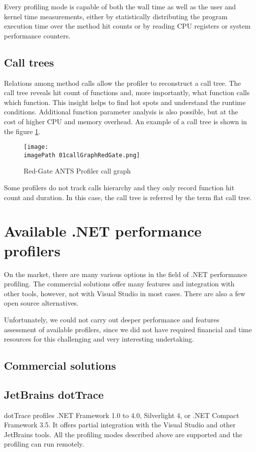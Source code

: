 Every profiling mode is capable of both the wall time as well as the user and kernel time measurements, either by statistically distributing the program execution time over the method hit counts or by reading CPU registers or system performance counters.

\subsection{Call trees}
Relations among method calls allow the profiler to reconstruct a call tree. The call tree reveals hit count of functions and, more importantly, what function calls which function. This insight helps to find hot spots and understand the runtime conditions.
Additional function parameter analysis is also possible, but at the cost of higher CPU and memory overhead. An example of a call tree is shown in the figure \ref{fig:01callGraphRedGate}.

\begin{figure}
	\centering
		\texttt{[image: \\imagePath 01callGraphRedGate.png]}
		\caption{Red-Gate ANTS Profiler call graph}
	\label{fig:01callGraphRedGate}
\end{figure}

Some profilers do not track calls hierarchy and they only record function hit count and duration. In this case, the call tree is referred by the term flat call tree.

\section{Available .NET performance profilers}
On the market, there are many various options in the field of .NET performance profiling. The commercial solutions offer many features and integration with other tools, however, not with Visual Studio in most cases. There are also a few open source alternatives.

Unfortunately, we could not carry out deeper performance and features assessment of available profilers, since we did not have required financial and time resources for this challenging and very interesting undertaking.

\subsection*{Commercial solutions}

\subsection{JetBrains dotTrace}
dotTrace profiles .NET Framework 1.0 to 4.0, Silverlight 4, or .NET Compact Framework 3.5. It offers partial integration with the Visual Studio and other JetBrains tools. All the profiling modes described above are supported and the profiling can run remotely.

